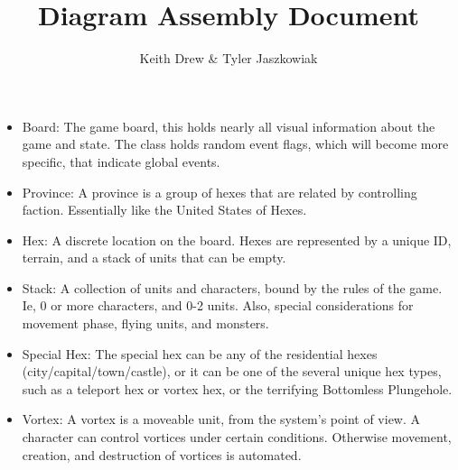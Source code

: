 \documentclass[12pt,a4paper]{article}
\author{Keith Drew \& Tyler Jaszkowiak}
\title{Diagram Assembly Document}
\begin{document}
\maketitle
\begin{itemize}
\item Board: The game board, this holds nearly all visual information about the game and state. The class holds random event flags, which will become more specific, that indicate global events.
\item Province: A province is a group of hexes that are related by controlling faction. Essentially like the United States of Hexes. 
\item Hex: A discrete location on the board. Hexes are represented by a unique ID, terrain, and a stack of units that can be empty.
\item Stack: A collection of units and characters, bound by the rules of the game. Ie, 0 or more characters, and 0-2 units. Also, special considerations for movement phase, flying units, and monsters.
\item Special Hex: The special hex can be any of the residential hexes (city/capital/town/castle), or it can be one of the several unique hex types, such as a teleport hex or vortex hex, or the terrifying Bottomless Plungehole. 
\item Vortex: A vortex is a moveable unit, from the system's point of view. A character can control vortices under certain conditions. Otherwise movement, creation, and destruction of vortices is automated.
\end{itemize}
\end{document}
